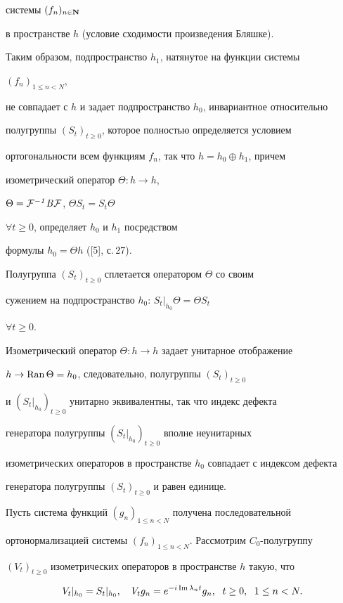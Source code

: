 системы $(f_n)_{n\in \bold N}$


в пространстве $h$ (условие сходимости произведения Бляшке).


Таким образом, подпространство $h_1$, натянутое на функции системы


$(f_n)_{1\leq n<N}$,


не совпадает с $h$ и задает подпространство $h_0$, инвариантное относительно


полугруппы $(S_t)_{t\geq 0}$, которое полностью определяется условием


ортогональности всем функциям $f_n$, так что $h=h_0\oplus h_1$, причем


изометрический оператор $\Theta :h\to h$,


$\Theta =\cal F\it ^{-1} B \cal F$, $\Theta S_t=S_t\Theta$


$\forall t\ge 0$, определяет $h_0$ и $h_1$ посредством


формулы $h_0=\Theta h$ ([5], с.\,27).





Полугруппа $(S_t)_{t\geq 0}$ сплетается оператором $\Theta $ со своим


сужением на подпространство $h_0$: $S_t|_{h_0}\Theta =\Theta S_t$


$\forall t\geq 0$.


Изометрический оператор $\Theta :h\to h$ задает унитарное отображение


$h\to \text{Ran\,}\Theta =h_0$, следовательно, полугруппы $(S_t)_{t\geq 0}$


и $(S_t|_{h_0})_{t\geq 0}$ унитарно эквивалентны, так что индекс дефекта


генератора полугруппы $(S_t|_{h_0})_{t\geq 0}$ вполне неунитарных


изометрических операторов в пространстве $h_0$ совпадает с индексом дефекта


генератора полугруппы $(S_t)_{t\geq 0}$ и равен единице.





Пусть система функций $(g_n)_{1\leq n<N}$ получена последовательной


ортонормализацией системы $(f_n)_{1\leq n<N}$. Рассмотрим $C_0$-полугруппу


$(V_t)_{t\geq 0}$ изометрических операторов в пространстве $h$ такую, что


\begin{equation}


V_t|_{h_0} = S_t|_{h_0},\quad


V_tg_n = e^{-i\im\lambda_nt}g_n,\ \; t\geq 0, \ \; 1\leq n<N.


\end{equation}





